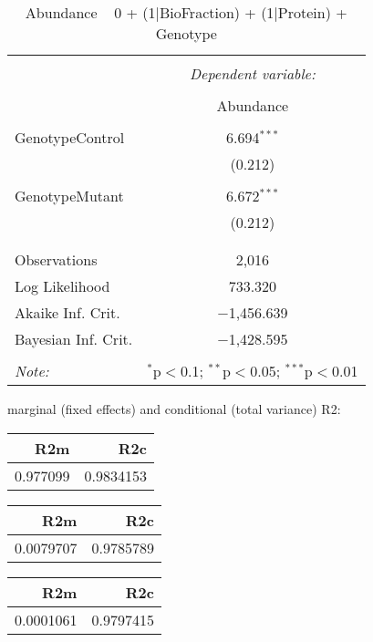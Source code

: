 \documentclass[11pt]{report}
\begin{document}
\begin{table}[!htbp] \centering 
  \caption{Abundance ~ 0 + (1|BioFraction) + (1|Protein) + Genotype} 
  \label{} 
\begin{tabular}{@{\extracolsep{5pt}}lc} 
\\[-1.8ex]\hline 
\hline \\[-1.8ex] 
 & \multicolumn{1}{c}{\textit{Dependent variable:}} \\ 
\cline{2-2} 
\\[-1.8ex] & Abundance \\ 
\hline \\[-1.8ex] 
 GenotypeControl & 6.694$^{***}$ \\ 
  & (0.212) \\ 
  & \\ 
 GenotypeMutant & 6.672$^{***}$ \\ 
  & (0.212) \\ 
  & \\ 
\hline \\[-1.8ex] 
Observations & 2,016 \\ 
Log Likelihood & 733.320 \\ 
Akaike Inf. Crit. & $-$1,456.639 \\ 
Bayesian Inf. Crit. & $-$1,428.595 \\ 
\hline 
\hline \\[-1.8ex] 
\textit{Note:}  & \multicolumn{1}{r}{$^{*}$p$<$0.1; $^{**}$p$<$0.05; $^{***}$p$<$0.01} \\ 
\end{tabular} 
\end{table} 
marginal (fixed effects) and conditional (total variance) R2:

\begin{tabular}{r|r}
\hline
R2m & R2c\\
\hline
0.977099 & 0.9834153\\
\hline
\end{tabular}

\begin{tabular}{r|r}
\hline
R2m & R2c\\
\hline
0.0079707 & 0.9785789\\
\hline
\end{tabular}

\begin{tabular}{r|r}
\hline
R2m & R2c\\
\hline
0.0001061 & 0.9797415\\
\hline
\end{tabular}
\end{document}
